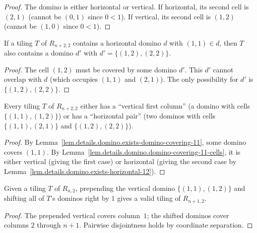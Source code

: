 \begin{proof}
\leanok
The domino is either horizontal or vertical. If horizontal, its second cell
is $(2,1)$ (cannot be $(0,1)$ since $0 < 1$). If vertical, its second cell
is $(1,2)$ (cannot be $(1,0)$ since $0 < 1$).
\end{proof}

\begin{lemma}
\label{lem.details.domino.exists-horizontal-12}
\leanhelper
\leanok
If a tiling $T$ of $R_{n+2,2}$ contains a horizontal domino $d$ with
$(1,1) \in d$, then $T$ also contains a domino $d'$ with
$d' = \{(1,2),(2,2)\}$.
\end{lemma}

\begin{proof}
\leanok
The cell $(1,2)$ must be covered by some domino $d'$. This $d'$ cannot
overlap with $d$ (which occupies $(1,1)$ and $(2,1)$). The only
possibility for $d'$ is $\{(1,2),(2,2)\}$.
\end{proof}

\begin{lemma}
\label{lem.details.domino.hasVerticalFirstColumn-or-horizontalPair}
\leanhelper
\leanok
Every tiling $T$ of $R_{n+2,2}$ either has a ``vertical first column''
(a domino with cells $\{(1,1),(1,2)\}$) or has a ``horizontal pair''
(two dominos with cells $\{(1,1),(2,1)\}$ and $\{(1,2),(2,2)\}$).
\end{lemma}

\begin{proof}
\leanok
By Lemma~\ref{lem.details.domino.exists-domino-covering-11}, some domino
covers $(1,1)$. By Lemma~\ref{lem.details.domino.domino-covering-11-cells},
it is either vertical (giving the first case) or horizontal (giving the
second case by Lemma~\ref{lem.details.domino.exists-horizontal-12}).
\end{proof}

\begin{lemma}
\label{lem.details.domino.prependVertical}
\leanhelper
\leanok
Given a tiling $T$ of $R_{n,2}$, prepending the vertical domino
$\{(1,1),(1,2)\}$ and shifting all of $T$'s dominos right by $1$ gives a
valid tiling of $R_{n+1,2}$.
\end{lemma}

\begin{proof}
\leanok
The prepended vertical covers column~$1$; the shifted dominos cover
columns $2$ through $n+1$. Pairwise disjointness holds by coordinate
separation.
\end{proof}

